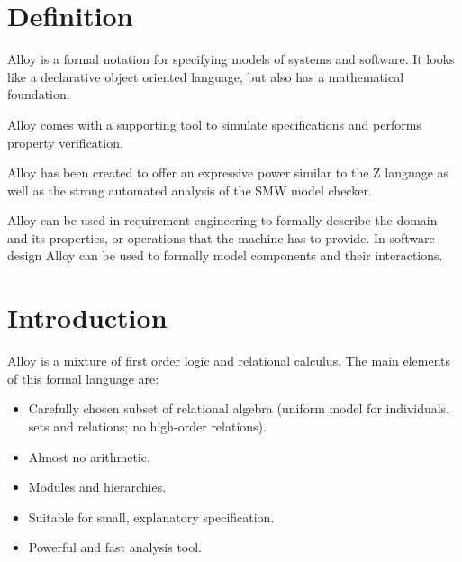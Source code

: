 \documentclass[12pt, a4paper]{report}
\theoremstyle{remark}
\begin{document}
\section{Definition}
    Alloy is a formal notation for specifying models of systems and software. It looks like a declarative object oriented language, but also has a mathematical foundation.
    \par
    Alloy comes with a supporting tool to simulate specifications and performs property verification.
    \par
    Alloy has been created to offer an expressive power similar to the Z language as well as the strong automated analysis of the SMW model checker. 
    \par
    Alloy can be used in requirement engineering  to formally describe the domain and its properties, or operations that the machine has to provide. In software design Alloy can be used to formally model components and their interactions. 
\section{Introduction}
    Alloy is a mixture of first order logic and relational calculus. The main elements of this formal language are: 
    \begin{itemize}
        \item Carefully chosen subset of relational algebra (uniform model for individuals, sets and relations; no high-order relations).
        \item Almost no arithmetic.
        \item Modules and hierarchies.
        \item Suitable for small, explanatory specification.
        \item Powerful and fast analysis tool.
    \end{itemize}
\end{document}
